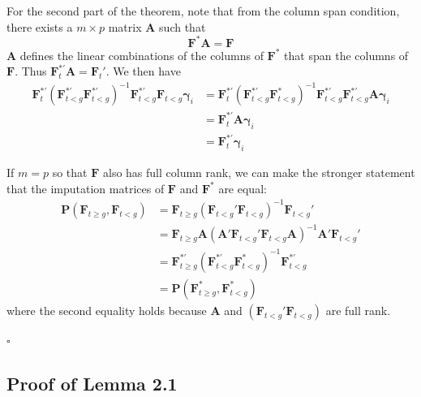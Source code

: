 \documentclass[12pt]{article}
\begin{document}
For the second part of the theorem, note that from the column span condition, there exists a $m \times p$ matrix $\bm A$ such that 
\begin{equation}
    \bm{F}^*\bm A = \bm{F}
\end{equation}
$\bm A$ defines the linear combinations of the columns of $\bm{F}^*$ that span the columns of $\bm{F}$. Thus $\bm{F}_t^{*'} \bm A = \bm{F}_t'$. We then have
\begin{align*}
    \bm{F}^{*'}_t (\bm{F}^{*'}_{t < g} \bm{F}^{*'}_{t < g})^{-1} \bm{F}^{*'}_{t < g} \bm{F}_{t < g} \bm \gamma_i
    &= \bm{F}^{*'}_t (\bm{F}^{*'}_{t < g} \bm{F}^{*}_{t < g})^{-1} \bm{F}^{*'}_{t < g} \bm{F}^{*'}_{t < g} \bm A \bm \gamma_i \\
    &= \bm{F}^{*'}_t \bm A \bm \gamma_i \\
    &= \bm{F}^{*'}_t \bm \gamma_i
\end{align*}

If $m = p$ so that $\bm{F}$ also has full column rank, we can make the stronger statement that the imputation matrices of $\bm{F}$ and $\bm{F}^{*}$ are equal: 
    \begin{align*}
        \bm P (\bm{F}_{t \geq g}, \bm{F}_{t < g}) 
        &= \bm{F}_{t \geq g} (\bm{F}_{t < g}' \bm{F}_{t < g})^{-1} \bm{F}_{t < g}' \\
        &= \bm{F}_{t \geq g} \bm A (\bm A'\bm{F}_{t < g}' \bm{F}_{t < g} \bm A)^{-1} \bm A' \bm{F}_{t < g}' \\
        &= \bm{F}^{*'}_{t \geq g} (\bm{F}^{*'}_{t < g} \bm{F}^{*}_{t < g})^{-1} \bm{F}^{*'}_{t < g} \\
        &= \bm P(\bm{F}^{*}_{t \geq g}, \bm{F}^{*}_{t < g})
    \end{align*}
    where the second equality holds because $\bm A$ and $(\bm{F}_{t < g}' \bm{F}_{t < g})$ are full rank.

$\square$

\subsection*{Proof of Lemma 2.1}
\end{document}

